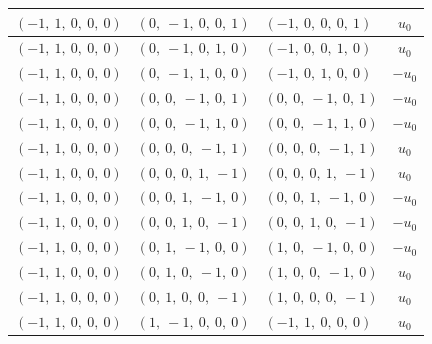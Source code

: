 \documentclass[11pt]{article}
\theoremstyle{definition}
\begin{document}
\begin{longtable}{|l|l|l|c|}
    \hline
    $\left( -1, \  1, \  0, \  0, \  0\right)$ & $\left( 0, \  -1, \  0, \  0, \  1\right)$ & $\left( -1, \  0, \  0, \  0, \  1\right)$ & $u_{0}$ \\
    \hline
    $\left( -1, \  1, \  0, \  0, \  0\right)$ & $\left( 0, \  -1, \  0, \  1, \  0\right)$ & $\left( -1, \  0, \  0, \  1, \  0\right)$ & $u_{0}$ \\
    \hline
    $\left( -1, \  1, \  0, \  0, \  0\right)$ & $\left( 0, \  -1, \  1, \  0, \  0\right)$ & $\left( -1, \  0, \  1, \  0, \  0\right)$ & $- u_{0}$ \\
    \hline
    $\left( -1, \  1, \  0, \  0, \  0\right)$ & $\left( 0, \  0, \  -1, \  0, \  1\right)$ & $\left( 0, \  0, \  -1, \  0, \  1\right)$ & $- u_{0}$ \\
    \hline
    $\left( -1, \  1, \  0, \  0, \  0\right)$ & $\left( 0, \  0, \  -1, \  1, \  0\right)$ & $\left( 0, \  0, \  -1, \  1, \  0\right)$ & $- u_{0}$ \\
    \hline
    $\left( -1, \  1, \  0, \  0, \  0\right)$ & $\left( 0, \  0, \  0, \  -1, \  1\right)$ & $\left( 0, \  0, \  0, \  -1, \  1\right)$ & $u_{0}$ \\
    \hline
    $\left( -1, \  1, \  0, \  0, \  0\right)$ & $\left( 0, \  0, \  0, \  1, \  -1\right)$ & $\left( 0, \  0, \  0, \  1, \  -1\right)$ & $u_{0}$ \\
    \hline
    $\left( -1, \  1, \  0, \  0, \  0\right)$ & $\left( 0, \  0, \  1, \  -1, \  0\right)$ & $\left( 0, \  0, \  1, \  -1, \  0\right)$ & $- u_{0}$ \\
    \hline
    $\left( -1, \  1, \  0, \  0, \  0\right)$ & $\left( 0, \  0, \  1, \  0, \  -1\right)$ & $\left( 0, \  0, \  1, \  0, \  -1\right)$ & $- u_{0}$ \\
    \hline
    $\left( -1, \  1, \  0, \  0, \  0\right)$ & $\left( 0, \  1, \  -1, \  0, \  0\right)$ & $\left( 1, \  0, \  -1, \  0, \  0\right)$ & $- u_{0}$ \\
    \hline
    $\left( -1, \  1, \  0, \  0, \  0\right)$ & $\left( 0, \  1, \  0, \  -1, \  0\right)$ & $\left( 1, \  0, \  0, \  -1, \  0\right)$ & $u_{0}$ \\
    \hline
    $\left( -1, \  1, \  0, \  0, \  0\right)$ & $\left( 0, \  1, \  0, \  0, \  -1\right)$ & $\left( 1, \  0, \  0, \  0, \  -1\right)$ & $u_{0}$ \\
    \hline
    $\left( -1, \  1, \  0, \  0, \  0\right)$ & $\left( 1, \  -1, \  0, \  0, \  0\right)$ & $\left( -1, \  1, \  0, \  0, \  0\right)$ & $u_{0}$ \\

\end{longtable}
\end{document}
